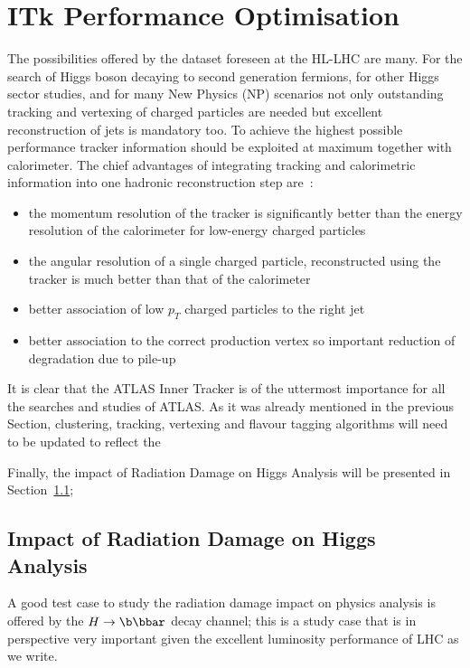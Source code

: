 \section{ITk Performance Optimisation}
\label{sec:algos}

The possibilities offered by the dataset foreseen at the HL-LHC are many. 
For the search of Higgs boson decaying to second generation fermions, for other Higgs sector 
studies, and for many New Physics (NP) scenarios not only outstanding tracking and vertexing of charged 
particles are needed but  excellent reconstruction of jets is mandatory  too. 
To achieve the highest possible performance tracker information should be exploited at maximum 
together with calorimeter. 
The chief advantages of integrating tracking and calorimetric information into one hadronic reconstruction
step are~\cite{ATLASParticleFlow}:
\begin{itemize}
\item the momentum resolution of the tracker is significantly better than the energy resolution of the
calorimeter for low-energy charged particles
\item the angular resolution of a single charged particle, reconstructed using the tracker is much better
than that of the calorimeter
\item better association of low $p_T$ charged particles to the right jet
\item better association to the correct production vertex so important reduction of degradation due to pile-up  
\end{itemize}
It is clear that the ATLAS Inner Tracker is of the uttermost importance for all
the searches and studies of ATLAS. 
As it was already mentioned in the previous Section, clustering, tracking, vertexing and flavour tagging 
algorithms will need to be updated to reflect the 


Finally, the impact of Radiation Damage on Higgs Analysis 
will be presented in Section~\ref{sec:raddamHiggs}; 

\subsection{Impact of Radiation Damage on Higgs Analysis}
\label{sec:raddamHiggs}

A good  test case to 
study the radiation damage impact  on physics analysis is offered by the $H\to\b\bbar$ decay channel; 
this is a study case that is in 
perspective very important given the excellent luminosity performance of LHC as we write.





